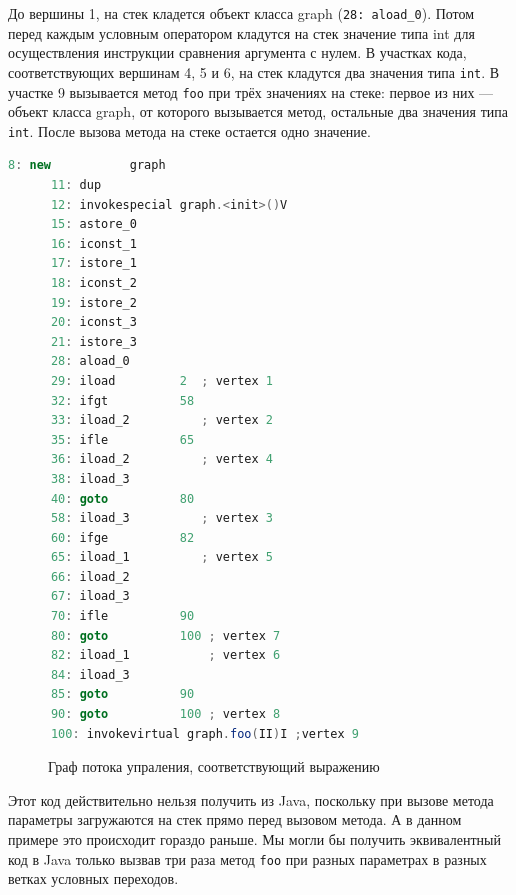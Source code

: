 До вершины 1, на стек кладется объект класса graph (\texttt{28: aload\_0}). Потом перед каждым условным оператором кладутся на стек значение типа int для осуществления инструкции сравнения аргумента с нулем. В участках кода, соответствующих вершинам 4, 5 и 6, на стек кладутся два значения типа \texttt{int}. В участке 9 вызывается метод \texttt{foo} при трёх значениях на стеке: первое из них --- объект класса graph, от которого вызывается метод, остальные два значения типа \texttt{int}. После вызова метода на стеке остается одно значение.

\begin{lstlisting}[label=graph-example,caption = Пример кода выражения в JVM с переходами, frame = single, language = JAVA]
       8: new           graph                  
      11: dup
      12: invokespecial graph.<init>()V                 
      15: astore_0
      16: iconst_1
      17: istore_1
      18: iconst_2
      19: istore_2
      20: iconst_3
      21: istore_3
      28: aload_0  
      29: iload         2  ; vertex 1
      32: ifgt          58 
      33: iload_2          ; vertex 2
      35: ifle          65 
      36: iload_2          ; vertex 4     
      38: iload_3
      40: goto          80 
      58: iload_3          ; vertex 3
      60: ifge          82 
      65: iload_1          ; vertex 5
      66: iload_2
      67: iload_3
      70: ifle          90     
      80: goto          100 ; vertex 7
      82: iload_1           ; vertex 6
      84: iload_3
      85: goto          90
      90: goto          100 ; vertex 8
      100: invokevirtual graph.foo(II)I ;vertex 9
\end{lstlisting}

\begin{figure} [h]
\caption{Граф потока упраления, соответствующий выражению}\label{graph}
\end{figure}

Этот код действительно нельзя получить из Java, поскольку при вызове метода параметры загружаются на стек прямо перед вызовом метода. А в данном примере это происходит гораздо раньше. Мы могли бы получить эквивалентный код в Java только вызвав три раза метод \texttt{foo} при разных параметрах в разных ветках условных переходов. 


